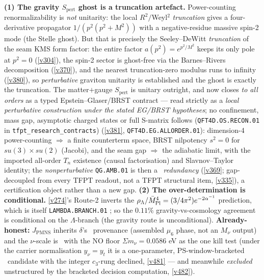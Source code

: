 \begin{keybox}
\textbf{(1) The gravity $S_{\mathrm{pert}}$ ghost is a truncation artefact.} Power-counting renormalizability is
\emph{not} unitarity: the local $R^2/$Weyl$^2$ \emph{truncation} gives a four-derivative propagator
$1/(p^2(p^2+M^2))$ with a negative-residue massive spin-2 mode (the Stelle ghost). But that is precisely the
Seeley--DeWitt \emph{truncation} of the seam KMS form factor: the entire factor $a(p^2){=}e^{p^2/M^2}$ keeps its
only pole at $p^2{=}0$ (\vref{v304}), the spin-2 sector is ghost-free via the Barnes--Rivers decomposition
(\vref{v370}), and the nearest truncation-zero modulus runs to infinity (\vref{v380}), so \emph{perturbative}
graviton unitarity is established and the ghost is exactly the truncation. The matter$+$gauge $S_{\mathrm{pert}}$ is
unitary outright, and now closes \emph{to all orders} as a typed Epstein--Glaser/BRST contract --- read strictly
as a \emph{local perturbative construction under the stated EG/BRST hypotheses}; no confinement, mass gap,
asymptotic charged states or full S-matrix follows (\texttt{QFT4D.OS.RECON.01} in \texttt{tfpt\_research\_contracts})
(\vref{v381}, \texttt{QFT4D.EG.ALLORDER.01}): dimension-4 power-counting $\Rightarrow$ a finite counterterm space,
BRST nilpotency $s^2{=}0$ for $su(3){\times}su(2)$ (Jacobi), and the seam gap $\Rightarrow$ the adiabatic limit,
with the imported all-order $T_n$ existence (causal factorisation) and Slavnov--Taylor identity; the
\emph{nonperturbative} \texttt{QG.AMB.01} is then a \mC\ \emph{redundancy} (\vref{v369};
gap-decoupled from every TFPT readout, not a TFPT structural item, \vref{v335}), a certification object rather than
a new gap.
\textbf{(2) The over-determination is conditional.} \vref{v274}'s Route-2 inverts the
$\rho_\Lambda/\bar M_{\mathrm{Pl}}^4=(3/4\pi^2)e^{-2\alpha^{-1}}$ prediction, which is itself \texttt{LAMBDA.BRANCH.01} \mC;
so the $0.11\%$ gravity-vs-cosmology agreement is conditional on the $\Lambda$-branch (the gravity route is
unconditional). \textbf{Already-honest:} $J_{\mathrm{PMNS}}$ inherits $\delta$'s \mC\ provenance (assembled
$\mu_6$ phase, not an $M_\nu$ output) and the $\nu$-scale is \mO\ with the NO floor $\Sigma m_\nu=0.0586$ eV as
the one kill test (under the carrier normalisation $y_\nu{=}y_t$ it is a one-parameter, PS-window-bracketed
\mO\ candidate with the integer $c_3$-rung declined, \vref{v481} --- and meanwhile \emph{excluded}
unstructured by the bracketed decision computation, \vref{v482}).
\end{keybox}

